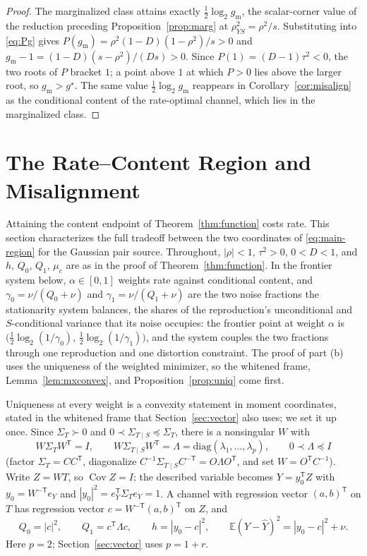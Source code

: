 \documentclass[11pt,onecolumn]{IEEEtran}
\newcommand{\E}{\mathbb{E}}
\newcommand{\Cov}{\operatorname{Cov}}
\newcommand{\hY}{\widehat{Y}}
\begin{document}
\begin{proof}
The marginalized class attains exactly $\tfrac12\log_2g_{\mathrm m}$, the
scalar-corner value of the reduction preceding
Proposition~\ref{prop:marg} at $\rho_{YS}^2=\rho^2/s$. Substituting into
\eqref{eq:Pg} gives $P(g_{\mathrm m})=\rho^2(1-D)(1-\rho^2)/s>0$ and
$g_{\mathrm m}-1=(1-D)(s-\rho^2)/(Ds)>0$. Since $P(1)=(D-1)\tau^2<0$, the two
roots of $P$ bracket $1$; a point above $1$ at which $P>0$ lies above
the larger root, so $g_{\mathrm m}>g^\star$. The same value
$\tfrac12\log_2 g_{\mathrm m}$ reappears in Corollary~\ref{cor:misalign} as
the conditional content of the rate-optimal channel, which lies in the
marginalized class.
\end{proof}


\section{The Rate--Content Region and Misalignment}
\label{sec:region}

Attaining the content endpoint of Theorem~\ref{thm:function} costs rate.
This section characterizes the full tradeoff between the
two coordinates of \eqref{eq:main-region} for the Gaussian pair source.
Throughout, $|\rho|<1$, $\tau^2>0$, $0<D<1$, and $h$, $Q_0$,
$Q_1$, $\mu_c$ are as in the proof of Theorem~\ref{thm:function}. In
the frontier system below, $\alpha\in[0,1]$ weights rate against
conditional content, and $\gamma_0=\nu/(Q_0+\nu)$ and $\gamma_1=\nu/(Q_1+\nu)$
are the two noise fractions the stationarity system balances, the
shares of the reproduction's unconditional and $S$-conditional variance
that its noise occupies: the frontier point at weight $\alpha$ is
$\bigl(\tfrac12\log_2(1/\gamma_0),\,\tfrac12\log_2(1/\gamma_1)\bigr)$, and
the system couples the two fractions through one reproduction and one
distortion constraint. The proof of part (b) uses the uniqueness of the
weighted minimizer, so the whitened frame, Lemma~\ref{lem:mxconvex}, and
Proposition~\ref{prop:uniq} come first.


Uniqueness at every weight is a convexity statement in moment
coordinates, stated in the whitened frame that Section~\ref{sec:vector}
also uses; we set it up once. Since
$\Sigma_T\succ0$ and $0\prec\Sigma_{T\mid S}\preceq\Sigma_T$, there is
a nonsingular $W$ with
\begin{equation}
W\Sigma_TW^{\mathsf T}=I,
\qquad
W\Sigma_{T\mid S}W^{\mathsf T}
=\Lambda=\mathrm{diag}(\lambda_1,\dots,\lambda_p),
\qquad 0\prec\Lambda\preceq I
\label{eq:whitening}
\end{equation}
(factor $\Sigma_T=CC^{\mathsf T}$, diagonalize
$C^{-1}\Sigma_{T\mid S}C^{-\mathsf T}=O\Lambda O^{\mathsf T}$, and set
$W=O^{\mathsf T}C^{-1}$). Write $Z=WT$, so $\Cov Z=I$; the described
variable becomes
$Y=y_0^{\mathsf T}Z$ with $y_0=W^{-\mathsf T}e_Y$ and
$|y_0|^2=e_Y^{\mathsf T}\Sigma_Te_Y=1$. A channel with regression
vector $(a,b)^{\mathsf T}$ on $T$ has regression vector
$c=W^{-\mathsf T}(a,b)^{\mathsf T}$ on $Z$, and
\[
Q_0=|c|^2,\qquad Q_1=c^{\mathsf T}\Lambda c,\qquad
h=|y_0-c|^2,\qquad
\E(Y-\hY)^2=|y_0-c|^2+\nu .
\]
Here $p=2$; Section~\ref{sec:vector} uses $p=1+r$.
\end{document}
